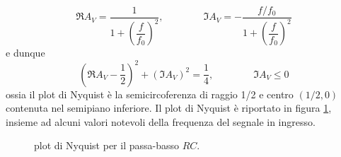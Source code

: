 \documentclass[a4paper, 11pt]{article}
\begin{document}
	\[\Re A_V=\frac{1}{1+\left(\dfrac{f}{f_0}\right)^2},\qquad\qquad\Im A_V=-\frac{f/f_0}{1+\left(\dfrac{f}{f_0}\right)^2}\]
	e dunque
	\[\left(\Re A_V-\frac{1}{2}\right)^2+(\Im A_V)^2=\frac{1}{4},\qquad\qquad \Im A_V\leq 0\]
	ossia il plot di Nyquist è la semicircoferenza di raggio 1/2 e centro $(1/2,0)$ contenuta nel semipiano inferiore. Il plot di Nyquist è riportato in figura \ref{fig:nyquistpassabasso}, insieme ad alcuni valori notevoli della frequenza del segnale in ingresso.
	\begin{figure}[h!]
		\centering
		\caption{plot di Nyquist per il passa-basso $RC$.}
		\label{fig:nyquistpassabasso}
	\end{figure}
\end{document}
